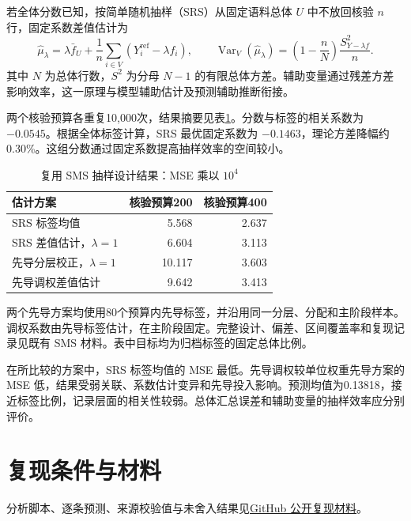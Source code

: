 \documentclass[UTF8,a4paper,zihao=-4,fontset=fandol]{ctexart}
\newcommand{\Var}{\operatorname{Var}}
\begin{document}
若全体分数已知，按简单随机抽样（SRS）从固定语料总体 $U$ 中不放回核验 $n$ 行，固定系数差值估计为
\begin{equation}
 \widehat\mu_\lambda=\lambda\bar f_U+
 \frac1n\sum_{i\in V}(Y_i^{\mathrm{ref}}-\lambda f_i),\qquad
 \Var_V(\widehat\mu_\lambda)=
 \left(1-\frac nN\right)\frac{S^2_{Y-\lambda f}}n.
 \label{eq:sms}
\end{equation}
其中 $N$ 为总体行数，$S^2$ 为分母 $N-1$ 的有限总体方差。辅助变量通过残差方差影响效率，这一原理与模型辅助估计及预测辅助推断衔接\citep{sarndal1992,ppi2023}。

两个核验预算各重复10,000次，结果摘要见表\ref{tab:sms}。分数与标签的相关系数为 $-0.0545$。根据全体标签计算，SRS 最优固定系数为 $-0.1463$，理论方差降幅约0.30\%。这组分数通过固定系数提高抽样效率的空间较小。

\begin{table}[htbp]
\centering\small
\caption{复用 SMS 抽样设计结果：MSE 乘以 $10^4$}\label{tab:sms}
\begin{tabular}{@{}lrr@{}}
\toprule
估计方案 & 核验预算200 & 核验预算400 \\
\midrule
SRS 标签均值 & 5.568 & 2.637 \\
SRS 差值估计，$\lambda=1$ & 6.604 & 3.113 \\
先导分层校正，$\lambda=1$ & 10.117 & 3.603 \\
先导调权差值估计 & 9.642 & 3.413 \\
\bottomrule
\end{tabular}
\vspace{0.3em}
\parbox{\textwidth}{\footnotesize 两个先导方案均使用80个预算内先导标签，并沿用同一分层、分配和主阶段样本。调权系数由先导标签估计，在主阶段固定。完整设计、偏差、区间覆盖率和复现记录见既有 SMS 材料。表中目标均为归档标签的固定总体比例。}
\end{table}

在所比较的方案中，SRS 标签均值的 MSE 最低。先导调权较单位权重先导方案的 MSE 低，结果受弱关联、系数估计变异和先导投入影响。预测均值为0.13818，接近标签比例，记录层面的相关性较弱。总体汇总误差和辅助变量的抽样效率应分别评价。

\section{复现条件与材料}\label{app:materials}

分析脚本、逐条预测、来源校验值与未舍入结果见\href{https://github.com/LeoAndJellyfish/semantic-decision-statistics}{GitHub 公开复现材料}。
\end{document}
